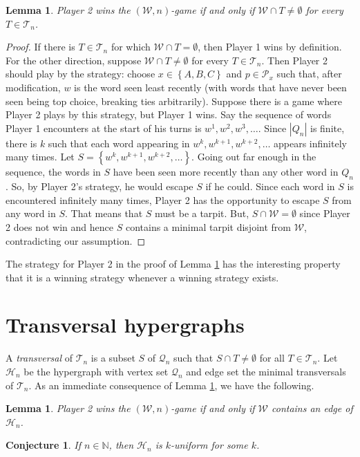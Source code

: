 \documentclass[12pt]{article}
\theoremstyle{plain}
\newtheorem{lem}[thm]{Lemma}
\newtheorem{conjecture}[thm]{Conjecture}
\theoremstyle{definition}
\theoremstyle{remark}
\newcommand{\fancy}[1]{\mathcal{#1}}
\newcommand{\IN}{\mathbb{N}}
\newcommand{\set}[1]{\left\{ #1 \right\}}
\def\Q{\fancy{Q}}
\def\H{\fancy{H}}
\def\W{\fancy{W}}
\def\P{\fancy{P}}
\def\T{\fancy{T}}
\begin{document}
\begin{lem}\label{TarpitEquiv}
	Player 2 wins the $(\W,n)$-game if and only if $\W \cap T \ne \emptyset$ for every $T \in \T_n$.
\end{lem}
\begin{proof}
	If there is $T \in \T_n$ for which $\W \cap T = \emptyset$, then Player 1 wins by definition.  For the other direction, suppose $\W \cap T \ne \emptyset$ for every $T \in \T_n$.  Then Player 2 should play by the strategy: choose $x \in \set{A, B, C}$ and $p \in \P_x$ such that, after modification, $w$ is the word seen least recently (with words that have never been seen being top choice, breaking ties arbitrarily).  Suppose there is a game where Player 2 plays by this strategy, but Player 1 wins.  Say the sequence of words Player 1 encounters at the start of his turns is $w^1, w^2, w^3, \ldots$.   Since $|Q_n|$ is finite, there is $k$ such that each word appearing in $w^k, w^{k+1}, w^{k+2}, \ldots$ appears infinitely many times.
	Let $S = \set{w^k, w^{k+1}, w^{k+2},\ldots}$.   Going out far enough in the sequence, the words in $S$ have been seen more recently than any other word in $Q_n$.  So, by Player 2's strategy, he would escape $S$ if he could.  Since each word in $S$ is encountered infinitely many times, Player 2 has the opportunity to escape $S$ from any word in $S$.  That means that $S$ must be a tarpit.  But, $S \cap \W = \emptyset$ since Player 2 does not win and hence $S$ contains a minimal tarpit disjoint from $\W$, contradicting our assumption.
\end{proof}

The strategy for Player 2 in the proof of Lemma \ref{TarpitEquiv} has the interesting property that it is a winning strategy whenever a winning strategy exists.

\section{Transversal hypergraphs}
A \emph{transversal} of $\T_n$ is a subset $S$ of $\Q_n$ such that $S \cap T \ne \emptyset$ for all $T \in \T_n$.  Let $\H_n$ be the hypergraph with vertex set $\Q_n$ and edge set the minimal transversals of $\T_n$.  As an immediate consequence of Lemma \ref{TarpitEquiv}, we have the following.

\begin{lem}\label{HypergraphEquiv}
		Player 2 wins the $(\W,n)$-game if and only if $\W$ contains an edge of $\H_n$.
\end{lem}

\begin{conjecture}
	If $n \in \IN$, then $\H_n$ is $k$-uniform for some $k$.
\end{conjecture}


\end{document}
